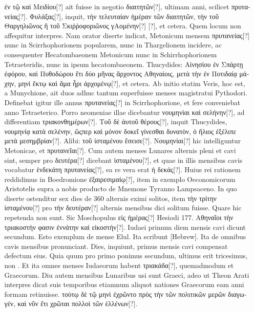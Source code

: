 \textgreek{ἐν τῷ καὶ Μειδίου[?]} ait fuisse in negotio
\textgreek{διαιτητῶν[?]}, ultimam anni, scilicet \textgreek{πρυτανείας[?]}.
\textgreek{Φυλάξας[?]}, inquit, \textgreek{τὴν τελευταίαν
ἡμέραν τῶν διαιτητῶν, τὴν τοῦ Θαργηλιῶνος ἢ τοῦ Σκιῤῥοφοριῶνος γΑομένην[?] [?]},
et cetera.
Quem locum non affequitur interpres.
Nam orator diserte
indicat, Metonicum mensem \textgreek{πρυτανείας[?]} nunc in Scirrhophorionem
popularem, nunc in Thargelionem incidere, ac consequenter
Hecatombaeonem Metonicum nunc in Schirrhophorionem Tetraeteridis,
nunc in ipsum hecatombaeonem.
Thucydides: \textgreek{Αἰνησίου ἐν Σπάρτῃ
ἐφόρου, καὶ Πυθοδώρου ἔτι δύο μῆνας ἄρχοντος Αθηναίοις, μετὰ τὴν ἐν
Ποτιδαίᾳ μάχην, μηνὶ ἕκτῳ καὶ ἅμα ἦρι ἀρχομένῳ[?]}, et cetera.
Ab initio statim
Veris, hoc est, a Munychione, ait duos adhuc tantum superfuisse
menses magistratui Pythodori.
Definebat igitur ille annus \textgreek{πρυτανείας[?]}
in Scirrhophorione, et fere conveniebat anno Tetraeterico.
Porro neomeniae
illae dicebantur \textgreek{νουμηνίαι καὶ σελήνην[?]}, ad differentiam
 \textgreek{τριακονθημέρων[?]}.
\textgreek{Τοῦ δὲ ἀυτοῦ θέρους[?]}, inquit Thucydides,
 \textgreek{νουμηνίᾳ κατὰ σελένην, ὥςπερ
καὶ μόνον δοκεῖ γίνεσθαι δυνατὸν, ὁ ἥλιος ἐξέλιπε μετὰ μεσημβρίαν[?]}.
Alibi:
\textgreek{τοῦ ἱσταμένου ἔσεισε[?]}.
\textgreek{Νουμηνίαι[?]} hic intelliguntur Metonicae, et
 \textgreek{πρυτανεῖαι[?]}.
Cum autem menses Lunares alternis pleni et cavi sint, semper pro
\textgreek{δευτέρα[?]} dicebant \textgreek{ἱσταμένου[?]},
 et quae in illis mensibus cavis
vocabatur \textgreek{ἑνδεκάτη πρυτανείας[?]},
 ea re vera erat \textgreek{ἡ δεκάς[?]}.
Huius rei rationem
reddidimus in Boedromione \textgreek{ἐξαιρεσιμαίῳ[?]}, item in exemplo
Oeconomicorum Aristotelis supra a nobis producto de Mnemone
Tyranno Lampsaceno.
In quo diserte ostenditur sex dies de 360 alternis
eximi solitos, item \textgreek{τὴν τρίτην ἱσταμένου[?]} pro
 \textgreek{τὴν δευτέραν[?]} alternis mensibus
dici solitum fuisse.
Quare hic repetenda non sunt.
Sic Moschopulus
\textgreek{εἰς ἡμέρας[?]} Hesiodi 177.
\textgreek{Αθηναῖοι τὴν τριακοστὴν φασιν ἐννάτην καὶ εἰκοστήν[?]}.
Iudaei primum diem mensis cavi dicunt secundum.
Esto exemplum
de mense Elul.
Ita scribunt \texthebrew{}[Hebrew].
Ita de
omnibus cavis mensibus pronunciant.
Dies, inquiunt, primus mensis
cavi compensat defectum eius.
Quia quum pro primo ponimus secundum,
ultimus erit tricesimus, non .
Et ita omnes menses Iudaeorum
habent \textgreek{τριακάδα[?]}, quemadmodum et Graecorum.
Diu autem
mensibus Lunaribus usi sunt Graeci, adeo ut Theon Arati interpres
dicat suis temporibus etiamnum aliquot nationes Graecorum eam anni
formam retinuisse.
\textgreek{τούτῳ δὲ τῷ μηνὶ ἐχρῶντο πρὸς τὴν τῶν πολιτικῶν μερῶν
διαγωγέν, καὶ νῦν ἔτι χρῶται πολλοὶ τῶν ἑλλένων[?]}.
%
